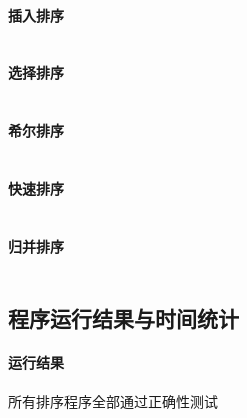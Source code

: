 \documentclass[UTF8]{ctexart}
\begin{document}
      \paragraph{插入排序}
      \inputminted{java}{src/InsertionSort.java}
      \paragraph{选择排序}
      \inputminted{java}{src/SelectionSort.java}
      \paragraph{希尔排序}
      \inputminted{java}{src/ShellSort.java}
      \paragraph{快速排序}
      \inputminted{java}{src/QuickSort.java}
      \paragraph{归并排序}
      \inputminted{java}{src/MergeSort.java}

    \subsection{程序运行结果与时间统计}
    \paragraph{运行结果} 所有排序程序全部通过正确性测试
\end{document}
